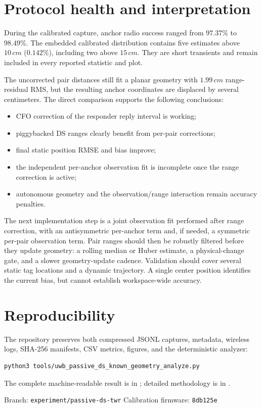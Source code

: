 \documentclass[10pt,a4paper]{article}
\newcommand{\cm}{\,cm}
\begin{document}
\section{Protocol health and interpretation}

During the calibrated capture, anchor radio success ranged from \(97.37\%\) to
\(98.49\%\). The embedded calibrated distribution contains five estimates
above \(10\cm\) (\(0.142\%\)), including two above \(15\cm\). They are short
transients and remain included in every reported statistic and plot.

The uncorrected pair distances still fit a planar geometry with
\(1.99\cm\) range-residual RMS, but the resulting anchor coordinates are
displaced by several centimeters. The direct comparison supports the
following conclusions:

\begin{itemize}
  \item CFO correction of the responder reply interval is working;
  \item piggybacked DS ranges clearly benefit from per-pair corrections;
  \item final static position RMSE and bias improve;
  \item the independent per-anchor observation fit is incomplete once the
        range correction is active;
  \item autonomous geometry and the observation/range interaction remain
        accuracy penalties.
\end{itemize}

The next implementation step is a joint observation fit performed after range
correction, with an antisymmetric per-anchor term and, if needed, a symmetric
per-pair observation term. Pair ranges should then be robustly filtered before
they update geometry: a rolling median or Huber estimate, a physical-change
gate, and a slower geometry-update cadence. Validation should cover several
static tag locations and a dynamic trajectory. A single center position
identifies the current bias, but cannot establish workspace-wide accuracy.

\section{Reproducibility}

The repository preserves both compressed JSONL captures, metadata, wireless
logs, SHA-256 manifests, CSV metrics, figures, and the deterministic analyzer:

\begin{verbatim}
python3 tools/uwb_passive_ds_known_geometry_analyze.py
\end{verbatim}

The complete machine-readable result is in
; detailed methodology is in .

\vfill
\begin{center}
\color{muted}\small
Branch: \texttt{experiment/passive-ds-twr} \quad
Calibration firmware: \texttt{8db125e}
\end{center}
\end{document}

